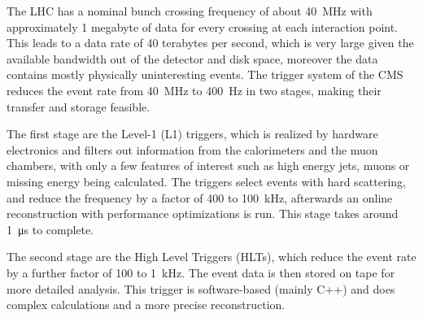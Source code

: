 The LHC has a nominal bunch crossing frequency of about \SI{40}{MHz} with approximately 1 megabyte of data for every crossing at each interaction point. This leads to a data rate of 40 terabytes per second, which is very large given the available bandwidth out of the detector and disk space, moreover the data contains mostly physically uninteresting events. The trigger system of the CMS reduces the event rate from \SI{40}{MHz} to \SI{400}{Hz} in two stages, making their transfer and storage feasible.

The first stage are the Level-1 (L1) triggers, which is realized by hardware electronics and filters out information from the calorimeters and the muon chambers, with only a few features of interest such as high energy jets, muons or missing energy being calculated. The triggers select events with hard scattering, and reduce the frequency by a factor of 400 to \SI{100}{kHz}, afterwards an online reconstruction with performance optimizations is run. This stage takes around \SI{1}{\micro s} to complete.

The second stage are the High Level Triggers (HLTs), which reduce the event rate by a further factor of 100 to \SI{1}{kHz}. The event data is then stored on tape for more detailed analysis. This trigger is software-based (mainly C++) and does complex calculations and a more precise reconstruction.